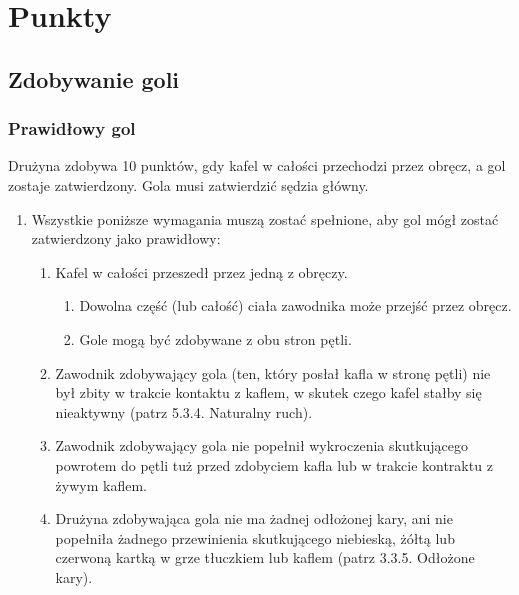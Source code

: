 \documentclass[12pt]{article}
\begin{document}
\pagebreak
\section{Punkty}

\subsection{Zdobywanie goli}

\subsubsection{Prawidłowy gol}
Drużyna zdobywa 10 punktów, gdy kafel w
całości przechodzi przez obręcz, a gol zostaje zatwierdzony. Gola musi
zatwierdzić sędzia główny.

\begin{enumerate}
	\item
	      Wszystkie poniższe wymagania muszą zostać spełnione, aby gol mógł
	      zostać zatwierdzony jako prawidłowy:

	      \begin{enumerate}
		      \item
		            Kafel w całości przeszedł przez jedną z obręczy.

		            \begin{enumerate}
			            \item
			                  Dowolna część (lub całość) ciała zawodnika może przejść przez
			                  obręcz.
			            \item
			                  Gole mogą być zdobywane z obu stron pętli.
		            \end{enumerate}
		      \item
		            Zawodnik zdobywający gola (ten, który posłał kafla w stronę pętli)
		            nie był zbity w trakcie kontaktu z kaflem, w skutek czego kafel
		            stałby się nieaktywny (patrz 5.3.4. Naturalny ruch).
		      \item
		            Zawodnik zdobywający gola nie popełnił wykroczenia skutkującego
		            powrotem do pętli tuż przed zdobyciem kafla lub w trakcie kontraktu
		            z żywym kaflem.
		      \item
		            Drużyna zdobywająca gola nie ma żadnej odłożonej kary, ani nie
		            popełniła żadnego przewinienia skutkującego niebieską, żółtą lub
		            czerwoną kartką w grze tłuczkiem lub kaflem (patrz 3.3.5. Odłożone
		            kary).


\end{enumerate}
\end{enumerate}
\end{document}

